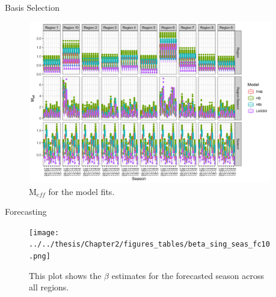 \documentclass[final]{beamer}
\newlength{\sepwid}
\newlength{\onecolwid}
\begin{document}
\begin{frame}[t]
\begin{columns}[t]
\begin{column}{\sepwid}\end{column} %

\begin{column}{\onecolwid} %


\begin{block}{Basis Selection}

\begin{figure}
\includegraphics[width=\linewidth]{plots/meff.png}
\caption{$\text{M}_{eff}$ for the model fits.}
\end{figure}


\end{block}


\begin{block}{Forecasting}
\begin{figure}
\texttt{[image: ../../thesis/Chapter2/figures\_tables/beta\_sing\_seas\_fc10.png]}
\caption{This plot shows the $\beta$ estimates for the forecasted season across all regions.}
\end{figure}
\end{block}




\end{column}
\end{columns}
\end{frame}
\end{document}
